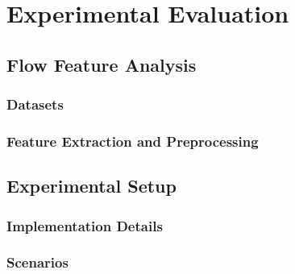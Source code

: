 \chapter{Experimental Evaluation}

\section{Flow Feature Analysis}

\subsection{Datasets}

\subsection{Feature Extraction and Preprocessing}

\section{Experimental Setup}

\subsection{Implementation Details}

\subsection{Scenarios}